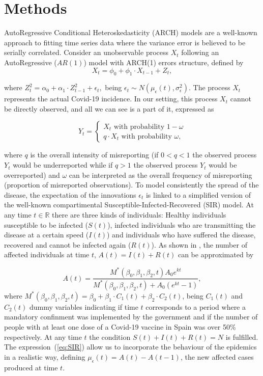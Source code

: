 \documentclass{bmcart}
\begin{document}
\section*{Methods}\label{methods}
AutoRegressive Conditional Heteroskedasticity (ARCH) models are a well-known approach to fitting time series data where the variance error is believed to be serially correlated. Consider an unobservable process $X_t$ following an AutoRegressive ($AR(1)$) model with ARCH(1) errors structure, defined by
$$
X_t = \phi_0 + \phi_1 \cdot X_{t-1} + Z_t,
$$

where $Z^2_t=\alpha_0+\alpha_1 \cdot Z^2_{t-1} + \epsilon_t,$ being $\epsilon_t \sim N(\mu_{\epsilon}(t), \sigma_{\epsilon}^2)$. The process $X_t$ represents the actual Covid-19 incidence. In our setting, this process $X_t$ cannot be directly observed, and all we can see is a part of it, expressed as

\begin{equation}\label{morina:eq1}
    Y_t=\left\{
                \begin{array}{ll}
                  X_t \text{ with probability } 1-\omega \\
                  q \cdot X_t \text{ with probability } \omega,
                \end{array}
              \right.
\end{equation}

where $q$ is the overall intensity of misreporting (if $0 < q < 1$ the observed process $Y_t$ would be underreported while if $q > 1$ the observed process $Y_t$ would be overreported) and $\omega$ can be interpreted as the overall frequency of misreporting (proportion of misreported observations). To model consistently the spread of the disease, the expectation of the innovations $\epsilon_t$ is linked to a simplified version of the well-known compartimental Susceptible-Infected-Recovered (SIR) model. At any time $t \in \mathbb{R}$ there are three kinds of individuals: Healthy individuals susceptible to be infected ($S(t)$), infected individuals who are transmitting the disease at a certain speed ($I(t)$) and individuals who have suffered the disease, recovered and cannot be infected again ($R(t)$). As shown in \cite{Fernandez-Fontelo2020}, the number of affected individuals at time $t$, $A(t) = I(t) + R(t)$ can be approximated by

\begin{equation}\label{eq:SIR}
  A(t) = \frac{M^{*}(\beta_0, \beta_1, \beta_2, t) A_0 e^{kt}}{M^{*}(\beta_0, \beta_1, \beta_2, t)+A_0(e^{kt}-1)},
\end{equation}
where $M^{*}(\beta_0, \beta_1, \beta_2, t) = \beta_0+\beta_1 \cdot C_1(t) + \beta_2 \cdot C_2(t)$, being $C_1(t)$ and $C_2(t)$ dummy variables indicating if time $t$ corresponds to a period where a mandatory confinment was implemented by the government and if the number of people with at least one dose of a Covid-19 vaccine in Spain was over 50\% respectively. At any time $t$ the condition $S(t) + I(t) + R(t) = N$ is fulfilled. The expression~(\ref{eq:SIR}) allow us to incorporate the behaviour of the epidemics in a realistic way, defining $\mu_{\epsilon}(t) = A(t) - A(t-1)$, the new affected cases produced at time $t$.
\end{document}
